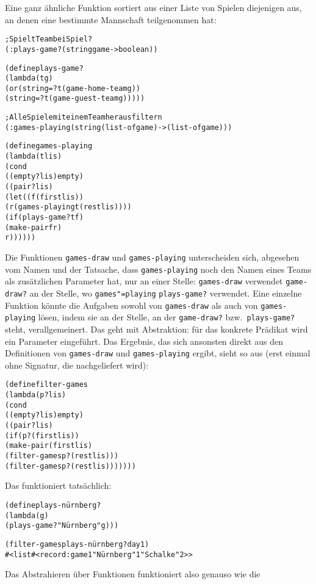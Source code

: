 Eine ganz ähnliche Funktion sortiert aus einer Liste von Spielen diejenigen
aus, an denen eine bestimmte Mannschaft teilgenommen hat:
%
\begin{alltt}
; Spielt Team bei Spiel?
(: plays-game? (string game -> boolean))

(define plays-game?
  (lambda (t g)
    (or (string=? t (game-home-team g))
        (string=? t (game-guest-team g)))))

; Alle Spiele mit einem Team herausfiltern
(: games-playing (string (list-of game) -> (list-of game)))

(define games-playing
  (lambda (t lis)
    (cond
      ((empty? lis) empty)
      ((pair? lis)
       (let ((f (first lis))
             (r (games-playing t (rest lis))))
         (if (plays-game? t f)
             (make-pair f r)
             r))))))
\end{alltt}
%
Die Funktionen \texttt{games-draw} und \texttt{games-playing} unterscheiden
sich, abgesehen vom Namen und der Tatsache, dass \texttt{games-playing} noch
den Namen eines Teams als zusätzlichen Parameter hat, nur an
einer Stelle: \texttt{games-draw} verwendet
\texttt{game-draw?} an der Stelle, wo \texttt{games"=playing} 
\texttt{plays-game?} verwendet.  Eine einzelne Funktion könnte die
Aufgaben sowohl von \texttt{games-draw} als auch von \texttt{games-playing}
lösen, indem sie an der Stelle, an der \texttt{game-draw?}
bzw.\ \texttt{plays-game?} steht, verallgemeinert.  Das geht mit
Abstraktion: für das konkrete Prädikat wird ein
Parameter eingeführt.  Das Ergebnis, das sich ansonsten
direkt aus den Definitionen von \texttt{games-draw} und
\texttt{games-playing} ergibt, sieht so aus (erst einmal ohne
Signatur, die nachgeliefert wird):
%
\begin{alltt}
(define filter-games
  (lambda (p? lis)
    (cond
      ((empty? lis) empty)
      ((pair? lis)
       (if (p? (first lis))
           (make-pair (first lis)
                      (filter-games p? (rest lis)))
           (filter-games p? (rest lis)))))))
\end{alltt}
%
Das funktioniert tatsächlich:
%
\begin{alltt}
(define plays-nürnberg?
   (lambda (g)
      (plays-game? "Nürnberg" g)))

(filter-games plays-nürnberg? day1)
\evalsto{} #<list #<record:game 1 "Nürnberg" 1 "Schalke" 2>>
\end{alltt}
%
Das Abstrahieren über Funktionen funktioniert also genauso wie die
